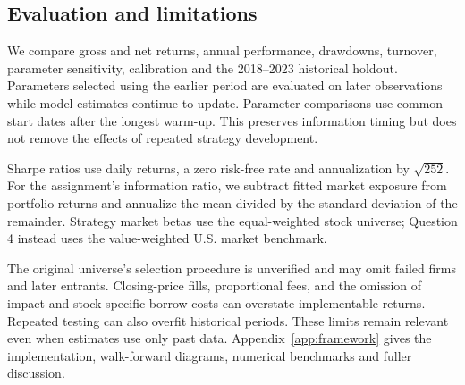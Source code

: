 \subsection{Evaluation and limitations}
We compare gross and net returns, annual performance, drawdowns, turnover, parameter sensitivity, calibration and the 2018--2023 historical holdout. Parameters selected using the earlier period are evaluated on later observations while model estimates continue to update. Parameter comparisons use common start dates after the longest warm-up. This preserves information timing but does not remove the effects of repeated strategy development.

Sharpe ratios use daily returns, a zero risk-free rate and annualization by $\sqrt{252}$. For the assignment's information ratio, we subtract fitted market exposure from portfolio returns and annualize the mean divided by the standard deviation of the remainder. Strategy market betas use the equal-weighted stock universe; Question 4 instead uses the value-weighted U.S. market benchmark.

The original universe's selection procedure is unverified and may omit failed firms and later entrants. Closing-price fills, proportional fees, and the omission of impact and stock-specific borrow costs can overstate implementable returns. Repeated testing can also overfit historical periods. These limits remain relevant even when estimates use only past data. Appendix~\ref{app:framework} gives the implementation, walk-forward diagrams, numerical benchmarks and fuller discussion.
